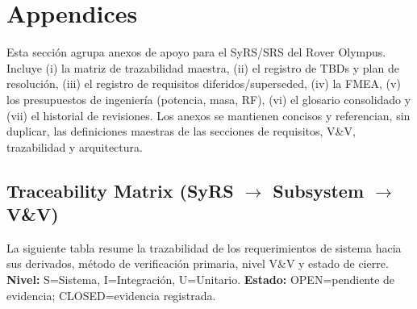 
\section{Appendices}\label{sec:appendices}

Esta sección agrupa anexos de apoyo para el SyRS/SRS del Rover Olympus. Incluye (i) la matriz de trazabilidad maestra, (ii) el registro de TBDs y plan de resolución, (iii) el registro de requisitos diferidos/superseded, (iv) la FMEA, (v) los presupuestos de ingeniería (potencia, masa, RF), (vi) el glosario consolidado y (vii) el historial de revisiones. Los anexos se mantienen concisos y referencian, sin duplicar, las definiciones maestras de las secciones de requisitos, V\&V, trazabilidad y arquitectura.

\subsection{Traceability Matrix (SyRS $\rightarrow$ Subsystem $\rightarrow$ V\&V)}
La siguiente tabla resume la trazabilidad de los requerimientos de sistema hacia sus derivados, método de verificación primaria, nivel V\&V y estado de cierre. \textbf{Nivel:} S=Sistema, I=Integración, U=Unitario. \textbf{Estado:} OPEN=pendiente de evidencia; CLOSED=evidencia registrada. \cite{nasa_cm, segoldmine_ppi}


